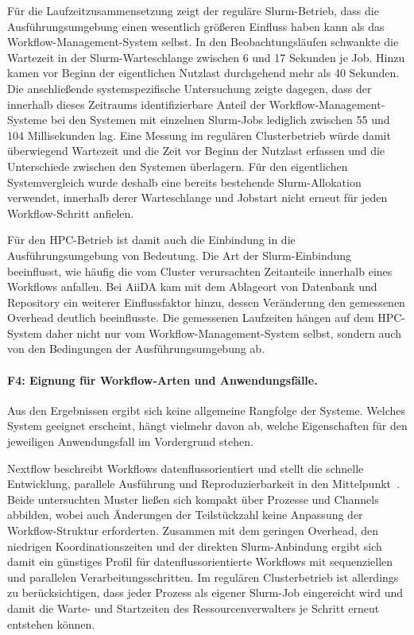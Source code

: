 Für die Laufzeitzusammensetzung zeigt der reguläre Slurm-Betrieb,
dass die Ausführungsumgebung einen wesentlich größeren Einfluss
haben kann als das Workflow-Management-System selbst. In den
Beobachtungsläufen schwankte die Wartezeit in der
Slurm-Warteschlange zwischen 6 und 17 Sekunden je Job. Hinzu kamen
vor Beginn der eigentlichen Nutzlast durchgehend mehr als
40 Sekunden. Die anschließende systemspezifische Untersuchung
zeigte dagegen, dass der innerhalb dieses Zeitraums
identifizierbare Anteil der Workflow-Management-Systeme bei den
Systemen mit einzelnen Slurm-Jobs lediglich zwischen 55 und
104 Millisekunden lag. Eine Messung im regulären Clusterbetrieb würde damit überwiegend Wartezeit und die Zeit vor Beginn der Nutzlast erfassen und die Unterschiede zwischen den Systemen überlagern. Für den eigentlichen Systemvergleich wurde deshalb eine bereits bestehende Slurm-Allokation verwendet, innerhalb derer
Warteschlange und Jobstart nicht erneut für jeden Workflow-Schritt
anfielen.

Für den HPC-Betrieb ist damit auch die Einbindung in die
Ausführungsumgebung von Bedeutung. Die Art der Slurm-Einbindung beeinflusst, wie häufig die vom Cluster verursachten Zeitanteile innerhalb eines
Workflows anfallen. Bei AiiDA kam mit dem Ablageort von Datenbank
und Repository ein weiterer Einflussfaktor hinzu, dessen
Veränderung den gemessenen Overhead deutlich beeinflusste. Die gemessenen Laufzeiten hängen auf dem HPC-System daher nicht nur
vom Workflow-Management-System selbst, sondern auch von den
Bedingungen der Ausführungsumgebung ab.

\paragraph{F4: Eignung für Workflow-Arten und Anwendungsfälle.}
Aus den Ergebnissen ergibt sich keine allgemeine Rangfolge der
Systeme. Welches System geeignet erscheint, hängt vielmehr davon
ab, welche Eigenschaften für den jeweiligen Anwendungsfall im
Vordergrund stehen.

Nextflow beschreibt Workflows datenflussorientiert und stellt die
schnelle Entwicklung, parallele Ausführung und Reproduzierbarkeit
in den Mittelpunkt~\cite{ditommaso2017nextflow}. Beide untersuchten
Muster ließen sich kompakt über Prozesse und Channels abbilden, wobei
auch Änderungen der Teilstückzahl keine Anpassung der
Workflow-Struktur erforderten. Zusammen mit dem geringen Overhead,
den niedrigen Koordinationszeiten und der direkten Slurm-Anbindung
ergibt sich damit ein günstiges Profil für datenflussorientierte
Workflows mit sequenziellen und parallelen Verarbeitungsschritten.
Im regulären Clusterbetrieb ist allerdings zu berücksichtigen, dass
jeder Prozess als eigener Slurm-Job eingereicht wird und damit die
Warte- und Startzeiten des Ressourcenverwalters je Schritt erneut
entstehen können.

